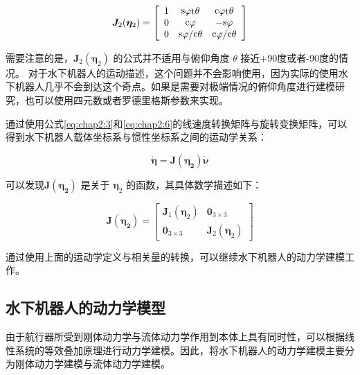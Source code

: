 \begin{equation*}
\centering
\label{eq:chap2:7}
{\bm{J}_2(\bm{\eta}_2)} =
 \left[ {\begin{array}{*{20}{c}}
   1 & {{\mathop{\rm s}\nolimits}  \varphi  {\mathop{\rm t}\nolimits}  \theta  } & {{\mathop{\rm c}\nolimits}  \varphi  {\mathop{\rm t}\nolimits}  \theta  }  \\
   0 & {{\mathop{\rm c}\nolimits}  \varphi  } & { - {\mathop{\rm s}\nolimits}  \varphi  }  \\
   0 & {{\mathop{\rm s}\nolimits}  \varphi  /{\mathop{\rm c}\nolimits}  \theta  } & {{\mathop{\rm c}\nolimits}  \varphi  /{\mathop{\rm c}\nolimits}  \theta  }  \\
\end{array}} \right]
\end{equation*}

需要注意的是，${\bm{J}_2(\bm{\eta}_2)}$ 的公式并不适用与俯仰角度 $\theta$ 接近+90度或者-90度的情况。 对于水下机器人的运动描述，这个问题并不会影响使用，因为实际的使用水下机器人几乎不会到达这个奇点。如果是需要对极端情况的俯仰角度进行建模研究，也可以使用四元数或者罗德里格斯参数来实现\cite{fossen1994guidance}。

通过使用公式\ref{eq:chap2:3}和\ref{eq:chap2:6}的线速度转换矩阵与旋转变换矩阵，可以得到水下机器人载体坐标系与惯性坐标系之间的运动学关系：

\begin{equation}
\label{eq:chap2:8}
\dot{\bm{\eta}}= \bm{J(\bm{\eta}_2)}   \dot{\bm{\nu}}
\end{equation}

可以发现$\bm{J(\bm{\eta}_2)}$ 是关于 $\bm{\eta}_2$ 的函数，其具体数学描述如下：

\begin{equation}
\label{eq:chap2:9}
\bm{J(\bm{\eta}_2)} = \begin{bmatrix}
 {\bm{J}_1(\bm{\eta}_2)}  &   \bm{0}_{3 \times 3}\\
 \bm{0}_{3 \times 3}      &  {\bm{J}_2(\bm{\eta}_2)}
\end{bmatrix}
\end{equation}

通过使用上面的运动学定义与相关量的转换，可以继续水下机器人的动力学建模工作。

\subsection{水下机器人的动力学模型  }
由于航行器所受到刚体动力学与流体动力学作用到本体上具有同时性，可以根据线性系统的等效叠加原理进行动力学建模\cite{lamb1932hydrodynamics}。因此，将水下机器人的动力学建模主要分为刚体动力学建模与流体动力学建模。

